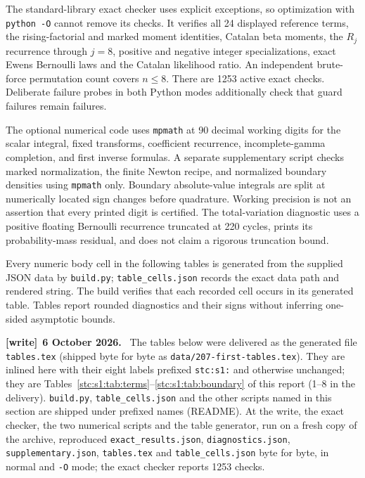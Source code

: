 \documentclass[11pt,letterpaper]{article}
\numberwithin{equation}{section}
\theoremstyle{remark}\newtheorem{remark}[theorem]{Remark}
\newcommand{\file}[1]{\nolinkurl{#1}}
\newenvironment{writenote}[1][]{\par\smallskip\begingroup\small
 \noindent\textbf{[write]}\if\relax\detokenize{#1}\relax\else~\textbf{#1.}\fi\ }%
 {\par\endgroup\smallskip}
\begin{document}
The standard-library exact checker uses explicit exceptions, so optimization with \texttt{python -O} cannot remove its checks. It verifies all 24 displayed reference terms, the rising-factorial and marked moment identities, Catalan beta moments, the $R_j$ recurrence through $j=8$, positive and negative integer specializations, exact Ewens Bernoulli laws and the Catalan likelihood ratio. An independent brute-force permutation count covers $n\leq8$. There are 1253 active exact checks. Deliberate failure probes in both Python modes additionally check that guard failures remain failures.

The optional numerical code uses \texttt{mpmath} at 90 decimal working digits for the scalar integral, fixed transforms, coefficient recurrence, incomplete-gamma completion, and first inverse formulas. A separate supplementary script checks marked normalization, the finite Newton recipe, and normalized boundary densities using \texttt{mpmath} only. Boundary absolute-value integrals are split at numerically located sign changes before quadrature. Working precision is not an assertion that every printed digit is certified. The total-variation diagnostic uses a positive floating Bernoulli recurrence truncated at 220 cycles, prints its probability-mass residual, and does not claim a rigorous truncation bound.

Every numeric body cell in the following tables is generated from the supplied JSON data by \texttt{build.py}; \texttt{table\_cells.json} records the exact data path and rendered string. The build verifies that each recorded cell occurs in its generated table. Tables report rounded diagnostics and their signs without inferring one-sided asymptotic bounds.

\begin{writenote}[6 October 2026]
The tables below were delivered as the generated file \file{tables.tex} (shipped byte for byte as \file{data/207-first-tables.tex}). They are inlined here with their eight labels prefixed \texttt{stc:s1:} and otherwise unchanged; they are Tables~\ref{stc:s1:tab:terms}--\ref{stc:s1:tab:boundary} of this report (1--8 in the delivery). \texttt{build.py}, \file{table_cells.json} and the other scripts named in this section are shipped under prefixed names (README). At the write, the exact checker, the two numerical scripts and the table generator, run on a fresh copy of the archive, reproduced \file{exact_results.json}, \file{diagnostics.json}, \file{supplementary.json}, \file{tables.tex} and \file{table_cells.json} byte for byte, in normal and \texttt{-O} mode; the exact checker reports 1253 checks.
\end{writenote}
\end{document}
